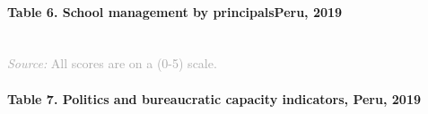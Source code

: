 \documentclass[twocolumn]{article}
\let\oldparagraph\paragraph
\renewcommand{\paragraph}[1]{\oldparagraph{#1}\mbox{}}
\begin{document}
\vfill\null

\hypertarget{table-6.-school-management-by-principalsperu-2019}{%
\paragraph{Table 6. School management by principalsPeru,
2019}\label{table-6.-school-management-by-principalsperu-2019}}

\begin{table}[H]
\\
{\scriptsize
    \textcolor{darkgray}{\textit{Source:} All scores are on a (0-5) scale.}
  }

\end{table}

\hypertarget{table-7.-politics-and-bureaucratic-capacity-indicators-peru-2019}{%
\paragraph{Table 7. Politics and bureaucratic capacity indicators, Peru,
2019}\label{table-7.-politics-and-bureaucratic-capacity-indicators-peru-2019}}
\end{document}
